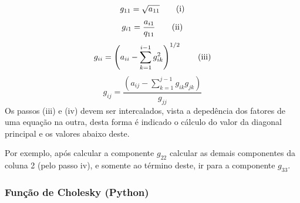 \documentclass[
]{book}
\begin{document}
\[
g_{11} = \sqrt{a_{11}} \tag{i}\\
\]
\[
g_{i1} = \frac{a_{i1}}{q_{11}} \tag{ii}\\
\]
\[
g_{ii} = \left(a_{ii} - \sum_{k=1}^{i-1} g_{ik}^2 \right)^{1/2} \tag{iii}\\
\]
\[
g_{ij} = \frac{\left(a_{ij} - \sum_{k=1}^{j-1} g_{ik}g_{jk} \right)}{g_{jj}} \tag{iv}
\]
Os passos (iii) e (iv) devem ser intercalados, vista a depedência dos fatores de uma equação na outra, desta forma é indicado o cálculo do valor da diagonal principal e os valores abaixo deste.

Por exemplo, após calcular a componente \(g_{22}\) calcular as demais componentes da coluna 2 (pelo passo iv), e somente ao término deste, ir para a componente \(g_{33}\).

\hypertarget{funuxe7uxe3o-de-cholesky-python}{%
\subsubsection{Função de Cholesky (Python)}\label{funuxe7uxe3o-de-cholesky-python}}
\end{document}
